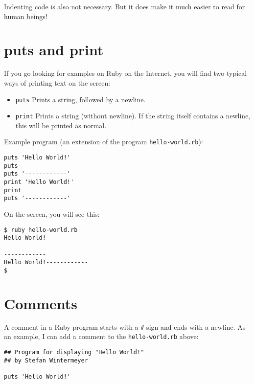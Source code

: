 \documentclass[a4paper]{book}
\begin{document}
Indenting code is also not necessary. But it does make it much easier to read for human beings!

\section{puts and print}\label{puts-and-print}

If you go looking for examples on Ruby on the Internet, you will find two typical ways of printing text on the screen:

\begin{itemize}
\itemsep1pt\parskip0pt
\item
  \texttt{puts} Prints a string, followed by a newline.
\item
  \texttt{print} Prints a string (without newline). If the string itself contains a newline, this will be printed as normal.
\end{itemize}

Example program (an extension of the program \texttt{hello-world.rb}):

\begin{shaded}\begin{verbatim}
puts 'Hello World!'
puts
puts '------------'
print 'Hello World!'
print
puts '------------'
\end{verbatim}\end{shaded}

On the screen, you will see this:

\begin{shaded}\begin{verbatim}
$ ruby hello-world.rb
Hello World!

------------
Hello World!------------
$
\end{verbatim}\end{shaded}

\section{Comments}\label{comments}

A comment in a Ruby program starts with a \texttt{\#}-sign and ends with a newline. As an example, I can add a comment to the \texttt{hello-world.rb} above:

\begin{shaded}\begin{verbatim}
## Program for displaying "Hello World!"
## by Stefan Wintermeyer

puts 'Hello World!'
\end{verbatim}\end{shaded}
\end{document}
